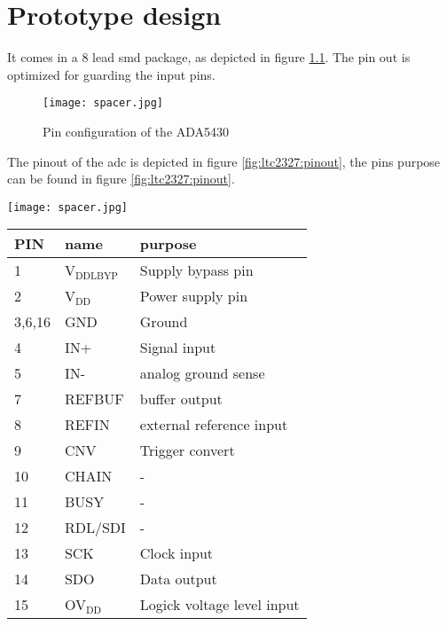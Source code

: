 \chapter{Prototype design}
\label{sec:prototype}
It comes in a 8 lead smd package, as depicted in figure \ref{fig:ADA4530}. The pin out is optimized for guarding the input pins. 
\begin{figure}
	\centering
	\texttt{[image: spacer.jpg]}
	\caption{Pin configuration of the ADA5430\cite{ADA4530}}
	\label{fig:ADA4530}
\end{figure}

The pinout of the adc is depicted in figure \ref{fig:ltc2327:pinout}, the pins purpose can be found in figure \ref{fig:ltc2327:pinout}.
\begin{minipage}{\textwidth}
	\centering
	\begin{minipage}{0.29\textwidth}
		\texttt{[image: spacer.jpg]}
		\label{fig:ltc2327:pinout}
	\end{minipage}\begin{minipage}{0.7\textwidth}
		\begin{tabular}{lll}
			\hline
			PIN & name & purpose\\\hline
			1 	& V$_\text{DDLBYP}$ & Supply bypass pin \\
			2   & V$_\text{DD}$     & Power supply pin\\
			3,6,16 & GND & Ground\\
			4      & IN+ & Signal input\\
			5      & IN- & analog ground sense\\
			7      & REFBUF & buffer output\\
			8      & REFIN & external reference input\\
			9      & CNV & Trigger convert\\		
			10      & CHAIN & -\\
			11      & BUSY & -\\
			12      & RDL/SDI & -\\
			13      & SCK & Clock input\\
			14      & SDO & Data output\\
			15      & OV$_\text{DD}$ & Logick voltage level input\\\hline
		\end{tabular}
		\label{tab:ltc2327:pinout}
	\end{minipage}
\end{minipage}
